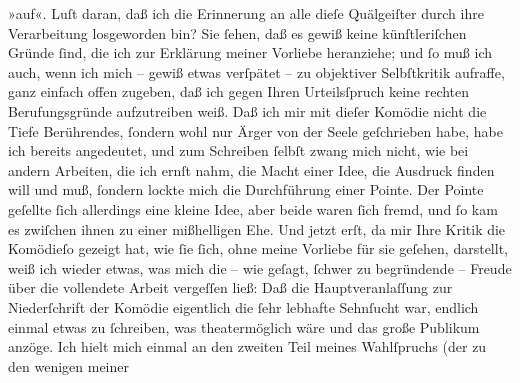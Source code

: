 \begin{ledgroupsized}[t]{13cm}
{{{                     »auf«.}}}\label{T_L02215-1h} Luſt daran, daß ich die Erinnerung an alle dieſe
               Quälgeiſter durch ihre Verarbeitung losgeworden bin?\pend
           \pstart
           Sie ſehen, daß es gewiß keine künſtleriſchen Gründe ſind, die ich zur Erklärung
               meiner Vorliebe heranziehe; und ſo muß ich auch, wenn {\pb}ich mich – gewiß etwas verſpätet – zu objektiver Selbſtkritik aufraffe, ganz
               einfach offen zugeben, daß ich gegen Ihren Urteilsſpruch keine rechten
               Berufungsgründe aufzutreiben weiß. Daß ich mir mit dieſer Komödie nicht die Tiefe
               Berührendes, ſondern wohl nur Ärger von der Seele geſchrieben habe, habe ich bereits
               angedeutet, und zum Schreiben ſelbſt zwang mich nicht, wie bei andern Arbeiten, die
               ich ernſt nahm, die Macht einer Idee, die Ausdruck finden will und muß, ſondern
               lockte mich die Durchführung einer Pointe. Der Pointe geſellte ſich allerdings eine
               kleine Idee, aber beide waren ſich fremd, und ſo kam es zwiſchen ihnen zu einer
               mißhelligen Ehe.\pend
           \pstart
           Und jetzt erſt, da mir Ihre Kritik die Komödieſo gezeigt hat, wie ſie ſich, ohne meine Vorliebe
               für sie geſehen, darstellt, weiß ich wieder etwas,
               was mich die – wie geſagt, ſchwer zu begründende – Freude über die vollendete Arbeit
               vergeſſen ließ: Daß die Hauptveranlaſſung zur Niederſchrift der Komödie eigentlich
               die ſehr lebhafte Sehnſucht war, endlich einmal etwas zu ſchreiben, was
               theatermöglich wäre und das große Publikum anzöge. Ich hielt mich einmal an den
               zweiten Teil meines Wahlſpruchs (der zu den wenigen meiner \label{K_L02215-1v}
\end{ledgroupsized}
